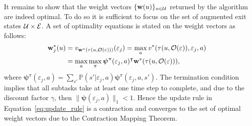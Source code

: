It remains to show that the weight vectors $\{\mathbf{w}(u)\}_{u\in\mathcal{U}}$ returned by the algorithm are indeed optimal. To do so it is sufficient to focus on the set of augmented exit states $\mathcal{U}\times\mathcal{E}$. A set of optimality equations is stated on the weight vectors as follows:
\begin{align*}
\mathbf{w}_j^*(u) &= v_{\mathbf{w}^*(\tau(u,\mathcal{O}(\varepsilon)))}(\varepsilon_j)= \max_a v^*(\tau(u,\mathcal{O}(\varepsilon)),\varepsilon_j,a)\\
 &= \max_a\max_\pi {\boldsymbol{\psi}}^\pi(\varepsilon_j,a)^\intercal \mathbf{w}^*(\tau(u,\mathcal{O}(\varepsilon))),
\end{align*}
where ${\boldsymbol{\psi}}^\pi(\varepsilon_j,a)=\sum_{s'}\mathbb{P}(s'|\varepsilon_j,a)\boldsymbol{\psi}^\pi(\varepsilon_j,a,s')$. The termination condition implies that all subtasks take at least one time step to complete, and due to the discount factor $\gamma$, then $\lVert\boldsymbol{\psi}(\varepsilon_j,a)\rVert_1<1$. Hence the update rule in Equation~\eqref{eq:update_rule} is a contraction and converges to the set of optimal weight vectors due to the Contraction Mapping Theorem.

